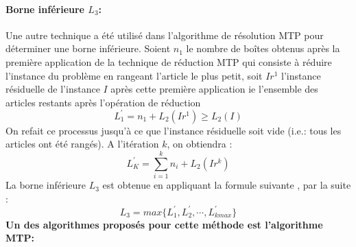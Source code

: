 \documentclass[class=report, crop=false]{standalone}
\begin{document}
    \paragraph{Borne inférieure  \(L_3\):}
    Une autre technique a été utilisé dans l’algorithme de résolution MTP pour déterminer une borne inférieure.
    Soient \(n_1\) le nombre de boîtes obtenus après la première application de la technique de réduction MTP qui consiste à réduire l’instance du problème en rangeant l’article le plus petit, soit \(Ir^1\) l’instance résiduelle de l’instance \(I\) après cette première application ie l’ensemble des articles restants après l’opération de réduction
    \[L^\prime_1=n_1+L_2(Ir^1) \ge L_2(I)\]
    On refait ce processus jusqu'à ce que l’instance résiduelle soit vide (i.e.: tous les articles ont été rangés). A l’itération \(k\), on obtiendra :
    \[L^\prime_K= \displaystyle\sum_{i=1}^{k} n_i + L_2(Ir^k)\] 
    La borne inférieure \(L_3\) est obtenue en appliquant la formule suivante , par la suite :
    \[L_3=max \{L^\prime_1, L^\prime_2,\cdots,L^\prime_{kmax}\}\]
    \textbf{Un des algorithmes proposés pour cette méthode est l’algorithme MTP:} 
\end{document}

